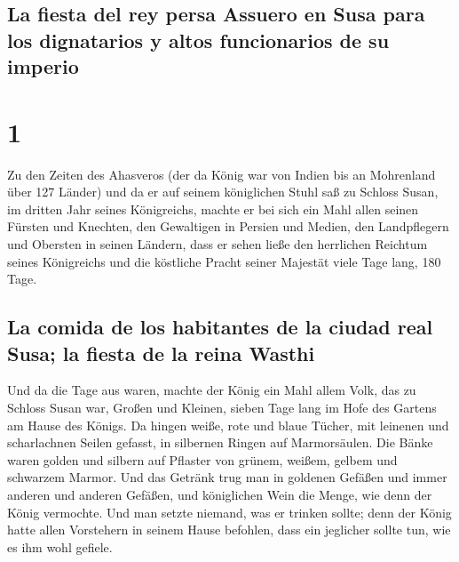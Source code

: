 \hypertarget{la-fiesta-del-rey-persa-assuero-en-susa-para-los-dignatarios-y-altos-funcionarios-de-su-imperio}{%
\subsection{La fiesta del rey persa Assuero en Susa para los dignatarios
y altos funcionarios de su
imperio}\label{la-fiesta-del-rey-persa-assuero-en-susa-para-los-dignatarios-y-altos-funcionarios-de-su-imperio}}

\hypertarget{section}{%
\section{1}\label{section}}

 Zu den Zeiten des Ahasveros (der da König war von Indien
bis an Mohrenland über 127 Länder)  und da er auf seinem
königlichen Stuhl saß zu Schloss Susan,  im dritten Jahr
seines Königreichs, machte er bei sich ein Mahl allen seinen Fürsten und
Knechten, den Gewaltigen in Persien und Medien, den Landpflegern und
Obersten in seinen Ländern,  dass er sehen ließe den
herrlichen Reichtum seines Königreichs und die köstliche Pracht seiner
Majestät viele Tage lang, 180 Tage.

\hypertarget{la-comida-de-los-habitantes-de-la-ciudad-real-susa-la-fiesta-de-la-reina-wasthi}{%
\subsection{La comida de los habitantes de la ciudad real Susa; la
fiesta de la reina
Wasthi}\label{la-comida-de-los-habitantes-de-la-ciudad-real-susa-la-fiesta-de-la-reina-wasthi}}

 Und da die Tage aus waren, machte der König ein Mahl
allem Volk, das zu Schloss Susan war, Großen und Kleinen, sieben Tage
lang im Hofe des Gartens am Hause des Königs.  Da hingen
weiße, rote und blaue Tücher, mit leinenen und scharlachnen Seilen
gefasst, in silbernen Ringen auf Marmorsäulen. Die Bänke waren golden
und silbern auf Pflaster von grünem, weißem, gelbem und schwarzem
Marmor.  Und das Getränk trug man in goldenen Gefäßen und
immer anderen und anderen Gefäßen, und königlichen Wein die Menge, wie
denn der König vermochte.  Und man setzte niemand, was er
trinken sollte; denn der König hatte allen Vorstehern in seinem Hause
befohlen, dass ein jeglicher sollte tun, wie es ihm wohl gefiele.

